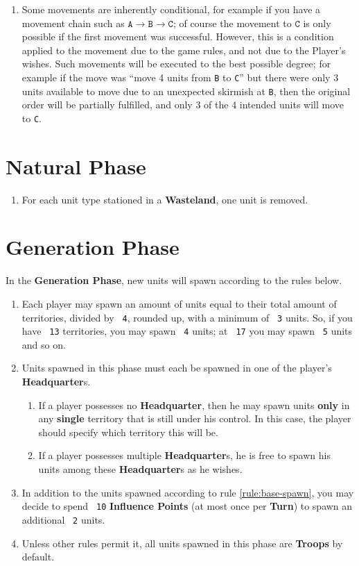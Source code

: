 \documentclass[10pt,openright,a4paper,openany]{article}
\newcommand{\num}[1]{\texttt{\color{purple} {#1}}}
\newcommand{\term}[1]{\textbf{\color{purple} #1}}
\newcommand{\headquarter}{\term{Headquarter}}
\begin{document}
\begin{enumerate}
	\begin{enumerate}
		\item Some movements are inherently conditional, for example if you have a movement chain such as $\texttt{A} \to \texttt{B} \to \texttt{C}$; of course the movement to $\texttt{C}$ is only possible if the first movement was successful. However, this is a condition applied to the movement due to the game rules, and not due to the Player's wishes. Such movements will be executed to the best possible degree; for example if the move was ``move 4 units from \texttt{B} to \texttt{C}'' but there were only 3 units available to move due to an unexpected skirmish at \texttt{B}, then the original order will be partially fulfilled, and only 3 of the 4 intended units will move to \texttt{C}.
	\end{enumerate}
\end{enumerate}

\section{Natural Phase}\label{sec:natural}
\begin{enumerate}
	\item For each unit type stationed in a \term{Wasteland}, one unit is removed.
\end{enumerate}

\section{Generation Phase}\label{sec:generation}
In the \term{Generation Phase}, new units will spawn according to the rules below.
\begin{enumerate}
	\item \label{rule:base-spawn}Each player may spawn an amount of units equal to their total amount of territories, divided by \num{4}, rounded up, with a minimum of \num{3} units. So, if you have \num{13} territories, you may spawn \num{4} units; at \num{17} you may spawn \num{5} units and so on.
	\item Units spawned in this phase must each be spawned in one of the player's \headquarter{}{}s.
	\begin{enumerate}
		\item If a player possesses no \headquarter{}, then he may spawn units \textbf{only} in any \textbf{single} territory that is still under his control. In this case, the player should specify which territory this will be.
		\item If a player possesses multiple \headquarter{}{}s, he is free to spawn his units among these \headquarter{}{}s as he wishes.
	\end{enumerate}

	\item In addition to the units spawned according to rule \ref{rule:base-spawn}, you may decide to spend \num{10} \term{Influence Points} (at most once per \term{Turn}) to spawn an additional \num{2} units.
	\item Unless other rules permit it, all units spawned in this phase are \term{Troops} by default.
\end{enumerate}
\end{document}
